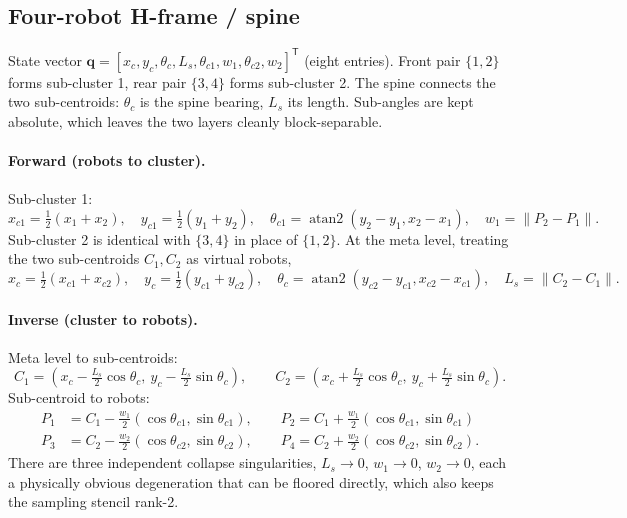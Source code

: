 \documentclass[12pt, letterpaper, oneside]{report}
\begin{document}
\subsection{Four-robot H-frame / spine}
\label{sec:atom_hframe}

State vector
$\mathbf{q}=[x_c,y_c,\theta_c,L_s,\theta_{c1},w_1,\theta_{c2},w_2]^{\mathsf T}$
(eight entries). Front pair $\{1,2\}$ forms sub-cluster 1, rear pair
$\{3,4\}$ forms sub-cluster 2. The spine connects the two sub-centroids:
$\theta_c$ is the spine bearing, $L_s$ its length. Sub-angles are kept
absolute, which leaves the two layers cleanly block-separable.

\paragraph{Forward (robots to cluster).} Sub-cluster 1:
\begin{equation}
x_{c1}=\tfrac12(x_1+x_2), \quad y_{c1}=\tfrac12(y_1+y_2), \quad
\theta_{c1}=\operatorname{atan2}(y_2-y_1,x_2-x_1), \quad w_1=\lVert P_2-P_1\rVert.
\end{equation}
Sub-cluster 2 is identical with $\{3,4\}$ in place of $\{1,2\}$. At the meta
level, treating the two sub-centroids $C_1, C_2$ as virtual robots,
\begin{equation}
x_c=\tfrac12(x_{c1}+x_{c2}), \quad y_c=\tfrac12(y_{c1}+y_{c2}), \quad
\theta_c=\operatorname{atan2}(y_{c2}-y_{c1},x_{c2}-x_{c1}), \quad L_s=\lVert C_2-C_1\rVert.
\end{equation}

\paragraph{Inverse (cluster to robots).} Meta level to sub-centroids:
\begin{equation}
C_1 = \left(x_c - \tfrac{L_s}{2}\cos\theta_c,\ y_c-\tfrac{L_s}{2}\sin\theta_c\right), \qquad
C_2 = \left(x_c + \tfrac{L_s}{2}\cos\theta_c,\ y_c+\tfrac{L_s}{2}\sin\theta_c\right).
\end{equation}
Sub-centroid to robots:
\begin{align}
P_1 &= C_1 - \tfrac{w_1}{2}(\cos\theta_{c1},\sin\theta_{c1}), \qquad
P_2 = C_1 + \tfrac{w_1}{2}(\cos\theta_{c1},\sin\theta_{c1}) \\
P_3 &= C_2 - \tfrac{w_2}{2}(\cos\theta_{c2},\sin\theta_{c2}), \qquad
P_4 = C_2 + \tfrac{w_2}{2}(\cos\theta_{c2},\sin\theta_{c2}).
\end{align}
There are three independent collapse singularities, $L_s\to0$, $w_1\to0$,
$w_2\to0$, each a physically obvious degeneration that can be floored
directly, which also keeps the sampling stencil rank-2.
\end{document}

